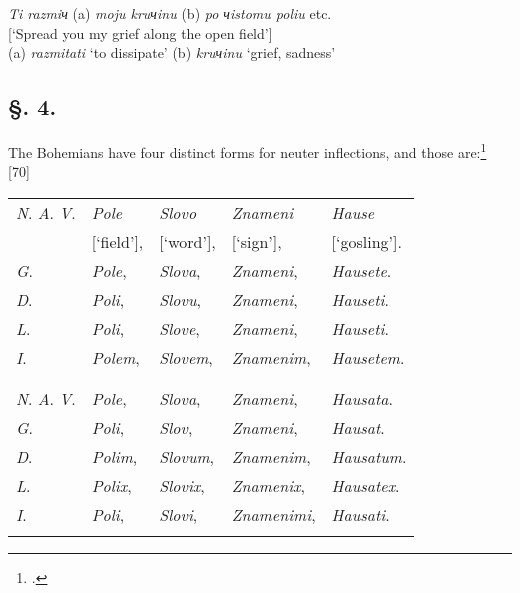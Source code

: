 \noindent\hspace*{1cm}\textit{Ti razmiч} (a) \textit{moju kruчinu} (b) \textit{po чistomu poliu} etc. \\
\hspace*{1cm}[‘Spread you my grief along the open field’] \\
\hspace*{1cm}(a) \textit{razmitati} ‘to dissipate’ (b) \textit{kruчinu} ‘grief, sadness’ \\

\newpage

\subsection*{\hspace*{\fill}§. 4.\hspace*{\fill}}

The Bohemians have four distinct forms for neuter inflections, and those are:\footnote{\citet[table insert at 234--235]{dobrovsky_ausfuhrliches_1809}.} [70]

\begin{longtable}{ l l l l l }
    \lsptoprule
    \multicolumn{5}{ c }{Singular.} \\
    \midrule
    \textit{N}. \textit{A}. \textit{V}. & \textit{Pole} & \textit{Slovo} & \textit{Znameni} & \textit{Hause} \\
    & [‘field’], & [‘word’], & [‘sign’], & [‘gosling’]. \\
    \textit{G}. & \textit{Pole}, & \textit{Slova}, & \textit{Znameni}, & \textit{Hausete}. \\
    \textit{D}. & \textit{Poli}, & \textit{Slovu}, & \textit{Znameni}, & \textit{Hauseti}.  \\ 
    \textit{L}. & \textit{Poli}, & \textit{Slove}, & \textit{Znameni}, & \textit{Hauseti}. \\
    \textit{I}. & \textit{Polem}, & \textit{Slovem}, & \textit{Znamenim}, & \textit{Hausetem}. \\
    \lspbottomrule
    \\
    \lsptoprule
    \multicolumn{5}{ c }{Plural.} \\
    \midrule
    \textit{N}. \textit{A}. \textit{V}. & \textit{Pole}, & \textit{Slova}, & \textit{Znameni}, & \textit{Hausata}. \\
    \textit{G}. & \textit{Poli}, & \textit{Slov}, & \textit{Znameni}, & \textit{Hausat}. \\
    \textit{D}. & \textit{Polim}, & \textit{Slovum}, & \textit{Znamenim}, & \textit{Hausatum}.  \\ 
    \textit{L}. & \textit{Polix}, & \textit{Slovix}, & \textit{Znamenix}, & \textit{Hausatex}. \\
    \textit{I}. & \textit{Poli}, & \textit{Slovi}, & \textit{Znamenimi}, & \textit{Hausati}. \\
    \lspbottomrule
\end{longtable}

